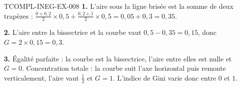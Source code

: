 \begin{corrige}{TCOMPL-INEG-EX-008}
\textbf{1.} L'aire sous la ligne brisée est la somme de deux trapèzes :
$\tfrac{0+0{,}2}{2}\times0{,}5+\tfrac{0{,}2+1}{2}\times0{,}5
=0{,}05+0{,}3=0{,}35$.

\textbf{2.} L'aire entre la bissectrice et la courbe vaut
$0{,}5-0{,}35=0{,}15$, donc $G=2\times0{,}15=0{,}3$.

\textbf{3.} Égalité parfaite : la courbe est la bissectrice, l'aire entre
elles est nulle et $G=0$. Concentration totale : la courbe suit l'axe
horizontal puis remonte verticalement, l'aire vaut $\tfrac12$ et $G=1$.
L'indice de Gini varie donc entre $0$ et $1$.
\end{corrige}
